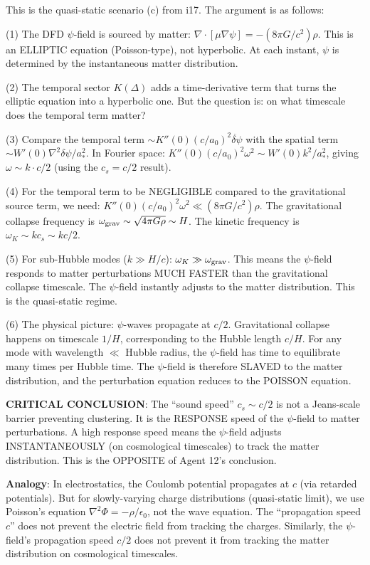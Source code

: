 \documentclass[11pt]{article}
\begin{document}
\begin{tcolorbox}[colback=blue!5!white, colframe=blue!70!black,
  title=\textbf{W4i18 TOP 5 FINDINGS --- DUST BRANCH EXISTENTIAL RESOLUTION}]
\begin{enumerate}
  This is the quasi-static scenario (c) from i17. The argument
  is as follows:

  (1) The DFD $\psi$-field is sourced by matter:
  $\nabla\cdot[\mu\nabla\psi] = -(8\pi G/c^2)\rho$.
  This is an ELLIPTIC equation (Poisson-type), not hyperbolic.
  At each instant, $\psi$ is determined by the instantaneous
  matter distribution.

  (2) The temporal sector $K(\Delta)$ adds a time-derivative term
  that turns the elliptic equation into a hyperbolic one. But the
  question is: on what timescale does the temporal term matter?

  (3) Compare the temporal term $\sim K''(0)(c/a_0)^2
  \ddot{\delta\psi}$ with the spatial term
  $\sim W'(0) \nabla^2\delta\psi / a_*^2$. In Fourier space:
  $K''(0)(c/a_0)^2 \omega^2 \sim W'(0) k^2/a_*^2$, giving
  $\omega \sim k \cdot c/2$ (using the $c_s = c/2$ result).

  (4) For the temporal term to be NEGLIGIBLE compared to the
  gravitational source term, we need:
  $K''(0)(c/a_0)^2 \omega^2 \ll (8\pi G/c^2)\rho$.
  The gravitational collapse frequency is
  $\omega_{\rm grav} \sim \sqrt{4\pi G\rho} \sim H$.
  The kinetic frequency is $\omega_K \sim k c_s \sim k c/2$.

  (5) For sub-Hubble modes ($k \gg H/c$):
  $\omega_K \gg \omega_{\rm grav}$. This means the $\psi$-field
  responds to matter perturbations MUCH FASTER than the
  gravitational collapse timescale. The $\psi$-field instantly
  adjusts to the matter distribution. This is the quasi-static
  regime.

  (6) The physical picture: $\psi$-waves propagate at $c/2$.
  Gravitational collapse happens on timescale $1/H$, corresponding
  to the Hubble length $c/H$. For any mode with wavelength $\ll$
  Hubble radius, the $\psi$-field has time to equilibrate many times
  per Hubble time. The $\psi$-field is therefore SLAVED to the
  matter distribution, and the perturbation equation reduces to
  the POISSON equation.

  \textbf{CRITICAL CONCLUSION}: The ``sound speed'' $c_s \sim c/2$
  is not a Jeans-scale barrier preventing clustering. It is the
  RESPONSE speed of the $\psi$-field to matter perturbations.
  A high response speed means the $\psi$-field adjusts
  INSTANTANEOUSLY (on cosmological timescales) to track the
  matter distribution. This is the OPPOSITE of Agent 12's
  conclusion.

  \textbf{Analogy}: In electrostatics, the Coulomb potential
  propagates at $c$ (via retarded potentials). But for
  slowly-varying charge distributions (quasi-static limit), we
  use Poisson's equation $\nabla^2\Phi = -\rho/\epsilon_0$,
  not the wave equation. The ``propagation speed $c$'' does not
  prevent the electric field from tracking the charges. Similarly,
  the $\psi$-field's propagation speed $c/2$ does not prevent it
  from tracking the matter distribution on cosmological timescales.


\end{enumerate}
\end{tcolorbox}
\end{document}
